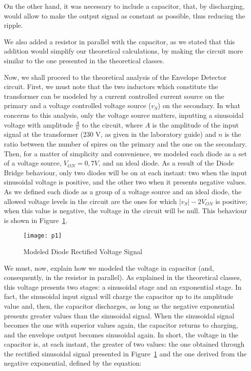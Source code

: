 On the other hand, it was necessary to include a capacitor, that, by discharging, would allow to make the output signal as constant as possible, thus reducing the ripple.

We also added a resistor in parallel with the capacitor, as we stated that this addition would simplify our theoretical calculations, by making the circuit more similar to the one presented in the theoretical classes.

Now, we shall proceed to the theoretical analysis of the Envelope Detector circuit. First, we must note that the two inductors which constitute the transformer can be modeled by a current controlled current source on the primary and a voltage controlled voltage source ($v_S$) on the secondary. In what concerns to this analysis, only the voltage source matters, inputting a sinusoidal voltage with amplitude $\frac{A}{n}$ to the circuit, where $A$ is the amplitude of the input signal at the transformer (230 V, as given in the laboratory guide) and $n$ is the ratio between the number of spires on the primary and the one on the secondary.
Then, for a matter of simplicity and convenience, we modeled each diode as a set of a voltage source, $V_{ON} = 0,7 V$, and an ideal diode. As a result of the Diode Bridge behaviour, only two diodes will be on at each instant: two when the input sinusoidal voltage is positive, and the other two when it presents negative values. As we defined each diode as a group of a voltage source and an ideal diode, the allowed voltage levels in the circuit are the ones for which $|v_S| - 2V_{ON}$ is positive; when this value is negative, the voltage in the circuit will be null. This behaviour is shown in Figure~\ref{fig:vSFinal}.

\begin{figure}[h] \centering
	\texttt{[image: p1]}
	\caption{Modeled Diode Rectified Voltage Signal}
	\label{fig:vSFinal}
\end{figure}   

We must, now, explain how we modeled the voltage in capacitor (and, consequently, in the resistor in parallel). As explained in the theoretical classes, this voltage presents two stages: a sinusoidal stage and an exponential stage. In fact, the sinusoidal input signal will charge the capacitor up to its amplitude value and, then, the capacitor discharges, as long as the negative exponential presents greater values than the sinusoidal signal. When the sinusoidal signal becomes the one with superior values again, the capacitor returns to charging, and the envelope output becomes sinusoidal again. In short, the voltage in the capacitor is, at each instant, the greater of two values: the one obtained through the rectified sinusoidal signal presented in Figure~\ref{fig:vSFinal} and the one derived from the negative exponential, defined by the equation:

